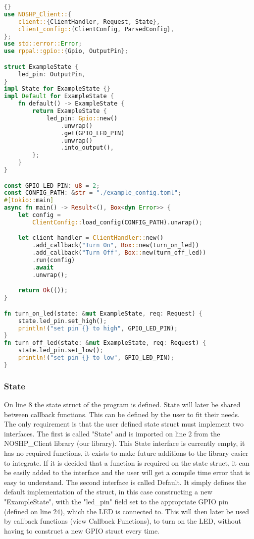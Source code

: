 \pagebreak
\begin{lstlisting}[language=Rust, style=boxed, showstringspaces=false]{}
use NOSHP_Client::{
    client::{ClientHandler, Request, State},
    client_config::{ClientConfig, ParsedConfig},
};
use std::error::Error;
use rppal::gpio::{Gpio, OutputPin};

struct ExampleState {
    led_pin: OutputPin,
}
impl State for ExampleState {}
impl Default for ExampleState {
    fn default() -> ExampleState {
        return ExampleState {
            led_pin: Gpio::new()
                .unwrap()
                .get(GPIO_LED_PIN)
                .unwrap()
                .into_output(),
        };
    }
}

const GPIO_LED_PIN: u8 = 2;
const CONFIG_PATH: &str = "./example_config.toml";
#[tokio::main]
async fn main() -> Result<(), Box<dyn Error>> {
    let config = 
        ClientConfig::load_config(CONFIG_PATH).unwrap();

    let client_handler = ClientHandler::new()
        .add_callback("Turn On", Box::new(turn_on_led))
        .add_callback("Turn Off", Box::new(turn_off_led))
        .run(config)
        .await
        .unwrap();

    return Ok(());
}

fn turn_on_led(state: &mut ExampleState, req: Request) {
    state.led_pin.set_high();
    println!("set pin {} to high", GPIO_LED_PIN);
}
fn turn_off_led(state: &mut ExampleState, req: Request) {
    state.led_pin.set_low();
    println!("set pin {} to low", GPIO_LED_PIN);
}
\end{lstlisting}

\subsubsection{State}
On line 8 the state struct of the program is defined. State will later be shared between callback functions. This can be defined by the user to fit their needs. The only requirement is that the user defined state struct must implement two interfaces. The first is called "State" and is imported on line 2 from the NOSHP\_Client library (our library). This State interface is currently empty, it has no required functions, it exists to make future additions to the library easier to integrate. If it is decided that a function is required on the state struct, it can be easily added to the interface and the user will get a compile time error that is easy to understand. The second interface is called Default. It simply defines the default implementation of the struct, in this case constructing a new "ExampleState", with the "led\_pin" field set to the appropriate GPIO pin (defined on line 24), which the LED is connected to. This will then later be used by callback functions (view Callback Functions), to turn on the LED, without having to construct a new GPIO struct every time.

